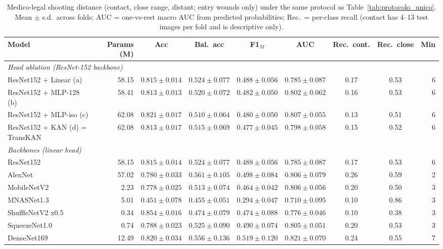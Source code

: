 \begin{table}[t]
\centering
\caption{Medico-legal shooting distance (contact, close range, distant; entry wounds only) under the same protocol as Table~\ref{tab:protocolo_unico}. Mean $\pm$ s.d.\ across folds; AUC = one-vs-rest macro AUC from predicted probabilities; Rec.\ = per-class recall (contact has 4--13 test images per fold and is descriptive only).}
\label{tab:mlsd_protocolo_unico}
\footnotesize
\begin{tabular}{lrccccccr}
\hline
Model & Params (M) & Acc & Bal.\ acc & F1$_M$ & AUC & Rec.\ cont. & Rec.\ close & Min \\
\hline
\multicolumn{9}{l}{\textit{Head ablation (ResNet-152 backbone)}} \\
ResNet152 + Linear (a) & 58.15 & $0.815 \pm 0.014$ & $0.524 \pm 0.077$ & $0.488 \pm 0.056$ & $0.785 \pm 0.087$ & 0.17 & 0.53 & 6 \\
ResNet152 + MLP-128 (b) & 58.41 & $0.813 \pm 0.013$ & $0.520 \pm 0.072$ & $0.482 \pm 0.050$ & $0.802 \pm 0.062$ & 0.16 & 0.53 & 6 \\
ResNet152 + MLP-iso (c) & 62.08 & $0.821 \pm 0.017$ & $0.510 \pm 0.064$ & $0.480 \pm 0.050$ & $0.807 \pm 0.055$ & 0.13 & 0.51 & 6 \\
ResNet152 + KAN (d) = TransKAN & 62.08 & $0.813 \pm 0.017$ & $0.515 \pm 0.069$ & $0.477 \pm 0.045$ & $0.798 \pm 0.058$ & 0.15 & 0.52 & 6 \\
\hline
\multicolumn{9}{l}{\textit{Backbones (linear head)}} \\
ResNet152 & 58.15 & $0.815 \pm 0.014$ & $0.524 \pm 0.077$ & $0.488 \pm 0.056$ & $0.785 \pm 0.087$ & 0.17 & 0.53 & 6 \\
AlexNet & 57.02 & $0.780 \pm 0.033$ & $0.561 \pm 0.105$ & $0.498 \pm 0.084$ & $0.806 \pm 0.079$ & 0.26 & 0.59 & 2 \\
MobileNetV2 & 2.23 & $0.778 \pm 0.025$ & $0.513 \pm 0.074$ & $0.464 \pm 0.042$ & $0.806 \pm 0.056$ & 0.20 & 0.50 & 3 \\
MNASNet1.3 & 5.01 & $0.451 \pm 0.078$ & $0.455 \pm 0.051$ & $0.294 \pm 0.047$ & $0.710 \pm 0.095$ & 0.10 & 0.86 & 3 \\
ShuffleNetV2 x0.5 & 0.34 & $0.854 \pm 0.016$ & $0.474 \pm 0.079$ & $0.474 \pm 0.088$ & $0.776 \pm 0.046$ & 0.10 & 0.38 & 3 \\
SqueezeNet1.0 & 0.74 & $0.788 \pm 0.023$ & $0.525 \pm 0.090$ & $0.490 \pm 0.074$ & $0.805 \pm 0.051$ & 0.20 & 0.53 & 3 \\
DenseNet169 & 12.49 & $0.820 \pm 0.034$ & $0.556 \pm 0.136$ & $0.519 \pm 0.120$ & $0.821 \pm 0.070$ & 0.24 & 0.55 & 7 \\

\end{tabular}
\end{table}
